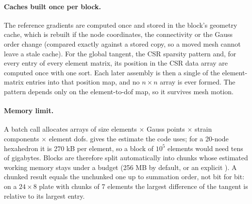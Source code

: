 \paragraph{Caches built once per block.} The reference gradients are computed once and stored in the block's geometry cache, which is rebuilt if the node coordinates, the connectivity or the Gauss order change (compared exactly against a stored copy, so a moved mesh cannot leave a stale cache). For the global tangent, the CSR sparsity pattern and, for every entry of every element matrix, its position in the CSR data array are computed once with one sort. Each later assembly is then a single  of the element-matrix entries into that position map, and no $n\times n$ array is ever formed. The pattern depends only on the element-to-dof map, so it survives mesh motion.

\paragraph{Memory limit.} A batch call allocates arrays of size elements $\times$ Gauss points $\times$ strain components $\times$ element dofs.  gives the estimate the code uses; for a 20-node hexahedron it is 270 kB per element, so a block of $10^5$ elements would need tens of gigabytes. Blocks are therefore split automatically into chunks whose estimated working memory stays under a budget (256 MB by default, or an explicit ). A chunked result equals the unchunked one up to summation order, not bit for bit: on a $24\times8$ plate with chunks of 7 elements the largest difference of the tangent is \cbkChunkDiff{} relative to its largest entry.

\begin{table}[ht]
\centering\small

\caption{Estimated working memory of a batched tangent call (the dominant arrays, not the peak resident memory), from the package's own estimate.}\label{tab:bk-chunk}
\end{table}


